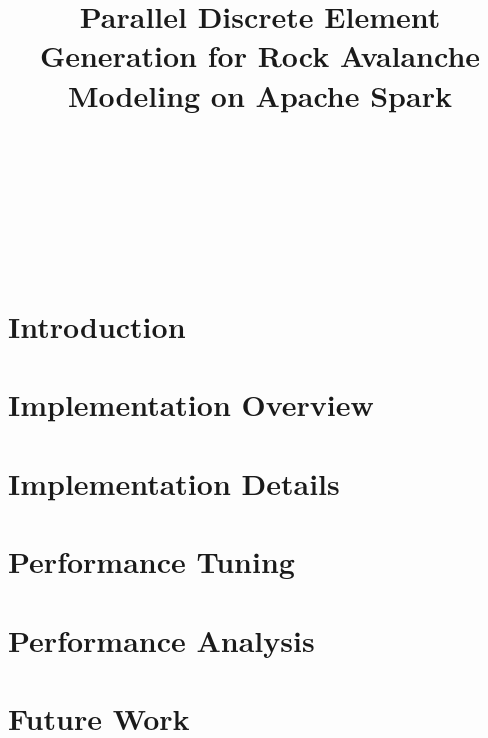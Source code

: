\documentclass{sig-alternate}
\begin{document}
\title{Parallel Discrete Element Generation for Rock Avalanche Modeling on Apache Spark}
\author{
    \\
    \\
    \\
    \\
    \\
    \\
}

\maketitle

\section{Introduction}


\section{Implementation Overview}


\section{Implementation Details}


\section{Performance Tuning}


\section{Performance Analysis}



\section{Future Work}



\nocite{*}

\end{document}
